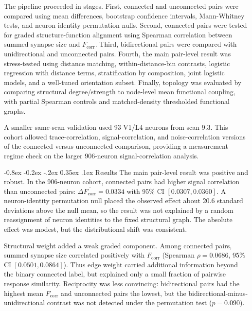 \documentclass[10pt,twocolumn]{article}
\makeatletter
\renewcommand\section{\@startsection {section}{1}{\z@}%
  {-0.8ex \@plus -0.2ex \@minus -.2ex}%
  {0.35ex \@plus.1ex}%
  {\normalfont\large\bfseries}}
\newcommand{\fcorr}{F_{\mathrm{corr}}}
\makeatother
\begin{document}
The pipeline proceeded in stages. First, connected and unconnected pairs were compared using mean differences, bootstrap confidence intervals, Mann-Whitney tests, and neuron-identity permutation nulls. Second, connected pairs were tested for graded structure-function alignment using Spearman correlation between summed synapse size and $\fcorr$. Third, bidirectional pairs were compared with unidirectional and unconnected pairs. Fourth, the main pair-level result was stress-tested using distance matching, within-distance-bin contrasts, logistic regression with distance terms, stratification by composition, joint logistic models, and a well-tuned orientation subset. Finally, topology was evaluated by comparing structural degree/strength to node-level mean functional coupling, with partial Spearman controls and matched-density thresholded functional graphs.

A smaller same-scan validation used 93 V1/L4 neurons from scan 9.3. This cohort allowed trace-correlation, signal-correlation, and noise-correlation versions of the connected-versus-unconnected comparison, providing a measurement-regime check on the larger 906-neuron signal-correlation analysis.

\section{Results}
The main pair-level result was positive and robust. In the 906-neuron cohort, connected pairs had higher signal correlation than unconnected pairs: $\Delta\bar{\fcorr}=0.0334$ with 95\% CI $[0.0307,0.0360]$. A neuron-identity permutation null placed the observed effect about 20.6 standard deviations above the null mean, so the result was not explained by a random reassignment of neuron identities to the fixed structural graph. The absolute effect was modest, but the distributional shift was consistent.

Structural weight added a weak graded component. Among connected pairs, summed synapse size correlated positively with $\fcorr$ (Spearman $\rho=0.0686$, 95\% CI $[0.0501,0.0864]$). Thus edge weight carried additional information beyond the binary connected label, but explained only a small fraction of pairwise response similarity. Reciprocity was less convincing: bidirectional pairs had the highest mean $\fcorr$ and unconnected pairs the lowest, but the bidirectional-minus-unidirectional contrast was not detected under the permutation test ($p=0.090$).
\end{document}
